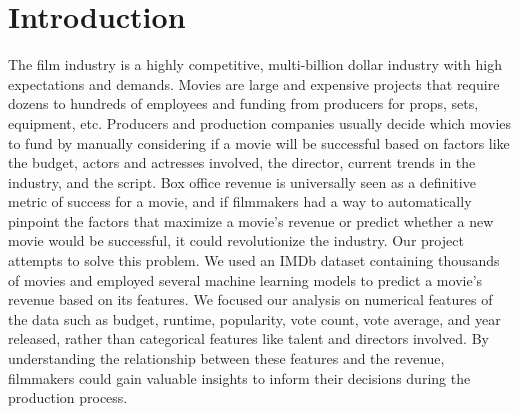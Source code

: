 \documentclass{article}
\begin{document}
\begin{abstract}
Making movies is no easy feat. Oftentimes, it can be hard to understand what aspects of a movie would make it a box office hit, and producers need to know what to invest their time in in order to make a great film that generates the most revenue. Is it the actors? The budget? The marketing?  In order to answer address this problem, our group ran 4 distinct models\textemdash Neural Networks, Logistic Regression, K-Nearest Neighbors (KNN), and Random Forests\textemdash to figure out what feature of a movie carries the most significance in determining its revenue, and therefore, success. After running our algorithms, we found that the budget has the most weight in revenue prediction with our Random Forests and KNN models having the highest accuracy. Lastly, we detail the social implications of our work and possible directions for future researchers. 
\end{abstract}

\section{Introduction}
\label{introduction}

The film industry is a highly competitive, multi-billion dollar industry with high expectations and demands. Movies are large and expensive projects that require dozens to hundreds of employees and funding from producers for props, sets, equipment, etc. Producers and production companies usually decide which movies to fund by manually considering if a movie will be successful based on factors like the budget, actors and actresses involved, the director, current trends in the industry, and the script. Box office revenue is universally seen as a definitive metric of success for a movie, and if filmmakers had a way to automatically pinpoint the factors that maximize a movie's revenue or predict whether a new movie would be successful, it could revolutionize the industry. Our project attempts to solve this problem. We used an IMDb dataset containing thousands of movies and employed several machine learning models to predict a movie's revenue based on its features. We focused our analysis on numerical features of the data such as budget, runtime, popularity, vote count, vote average, and year released, rather than categorical features like talent and directors involved. By understanding the relationship between these features and the revenue, filmmakers could gain valuable insights to inform their decisions during the production process.
\end{document}
